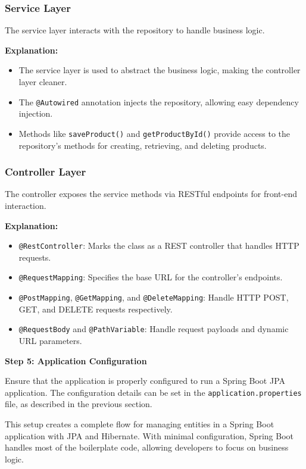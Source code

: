 \documentclass{article}
\begin{document}
\subsubsection{Service Layer}

The service layer interacts with the repository to handle business logic.

\textbf{Explanation:}
\begin{itemize}
    \item The service layer is used to abstract the business logic, making the controller layer cleaner.
    \item The \texttt{@Autowired} annotation injects the repository, allowing easy dependency injection.
    \item Methods like \texttt{saveProduct()} and \texttt{getProductById()} provide access to the repository’s methods for creating, retrieving, and deleting products.
\end{itemize}

\subsubsection{Controller Layer}

The controller exposes the service methods via RESTful endpoints for front-end interaction.

\textbf{Explanation:}
\begin{itemize}
    \item \texttt{@RestController}: Marks the class as a REST controller that handles HTTP requests.
    \item \texttt{@RequestMapping}: Specifies the base URL for the controller’s endpoints.
    \item \texttt{@PostMapping}, \texttt{@GetMapping}, and \texttt{@DeleteMapping}: Handle HTTP POST, GET, and DELETE requests respectively.
    \item \texttt{@RequestBody} and \texttt{@PathVariable}: Handle request payloads and dynamic URL parameters.
\end{itemize}

\textbf{Step 5: Application Configuration}

Ensure that the application is properly configured to run a Spring Boot JPA application. The configuration details can be set in the \texttt{application.properties} file, as described in the previous section.

This setup creates a complete flow for managing entities in a Spring Boot application with JPA and Hibernate. With minimal configuration, Spring Boot handles most of the boilerplate code, allowing developers to focus on business logic.
\end{document}
